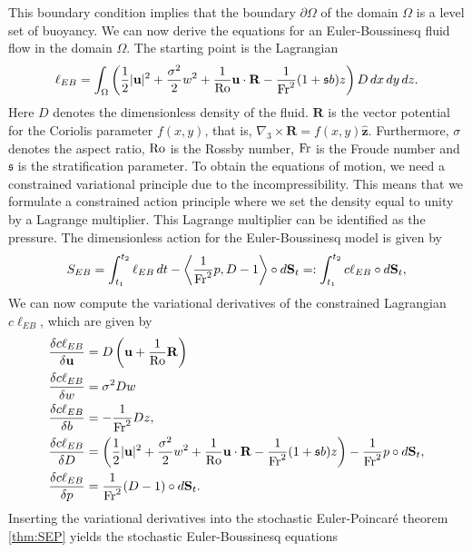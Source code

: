 \documentclass[11pt, oneside]{article}   	%
\numberwithin{equation}{section}
\theoremstyle{plain}
\theoremstyle{definition}
\theoremstyle{remark}
\newcommand{\<}{\langle}
\renewcommand{\>}{\rangle}
\begin{document}
This boundary condition implies that the boundary $\partial\Omega$ of the domain $\Omega$ is a level set of buoyancy. We can now derive the equations for an Euler-Boussinesq fluid flow in the domain $\Omega$. The starting point is the Lagrangian 
\begin{equation}
\ell_{EB} = \int_{\Omega}\left(\frac{1}{2}|\mathbf{u}|^2 + \frac{\sigma^2}{2}w^2 + \frac{1}{{\rm Ro}}\mathbf{u}\cdot\mathbf{R} - \frac{1}{{\rm Fr}^2}(1+\mathfrak{s}b)z\right)D\,dx\,dy\,dz.
\end{equation}
Here $D$ denotes the dimensionless density of the fluid. $\mathbf{R}$ is the vector potential for the Coriolis parameter $f(x,y)$, that is, $\nabla_3\times\mathbf{R} = f(x,y)\hat{\mathbf{z}}$. Furthermore, $\sigma$ denotes the aspect ratio, ${\rm Ro}$ is the Rossby number, ${\rm Fr}$ is the Froude number and $\mathfrak{s}$ is the stratification parameter. To obtain the equations of motion, we need a constrained variational principle due to the incompressibility. This means that we formulate a constrained action principle where we set the density equal to unity by a Lagrange multiplier. This Lagrange multiplier can be identified as the pressure. The dimensionless action for the Euler-Boussinesq model is given by
\begin{equation}
S_{EB} = \int_{t_1}^{t_2}\ell_{EB}\,dt - \left\langle\frac{1}{{\rm Fr}^2} p, D-1\right\rangle\circ d\mathbf{S}_t =: \int_{t_1}^{t_2} c\ell_{EB}\circ d\mathbf{S}_t,
\end{equation}
We can now compute the variational derivatives of the constrained Lagrangian $c\ell_{EB}$, which are given by 
\begin{equation}
\begin{aligned}
\frac{\delta c\ell_{EB}}{\delta \mathbf{u}} &= D\left(\mathbf{u}+\frac{1}{{\rm Ro}}\mathbf{R}\right)\\
\frac{\delta c\ell_{EB}}{\delta w} &= \sigma^2 Dw\\
\frac{\delta c\ell_{EB}}{\delta b} &= -\frac{1}{{\rm Fr}^2}Dz,\\
\frac{\delta c\ell_{EB}}{\delta D} &= \left(\frac{1}{2}|\mathbf{u}|^2 + \frac{\sigma^2}{2}w^2 + \frac{1}{{\rm Ro}}\mathbf{u}\cdot\mathbf{R} - \frac{1}{{\rm Fr}^2}(1+\mathfrak{s}b)z\right) - \frac{1}{{\rm Fr}^2} p \circ d\mathbf{S}_t,\\
\frac{\delta c\ell_{EB}}{\delta p} &= \frac{1}{{\rm Fr}^2}(D-1)\circ d\mathbf{S}_t.
\end{aligned}
\end{equation}
Inserting the variational derivatives into the stochastic Euler-Poincar\'e theorem \ref{thm:SEP} yields the stochastic Euler-Boussinesq equations
\end{document}
